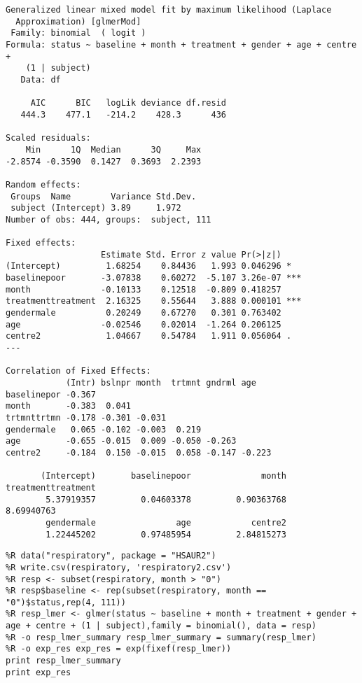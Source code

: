 \documentclass[12pt,fleqn]{article}\usepackage{../common}
\begin{document}
\begin{verbatim}
Generalized linear mixed model fit by maximum likelihood (Laplace
  Approximation) [glmerMod]
 Family: binomial  ( logit )
Formula: status ~ baseline + month + treatment + gender + age + centre +  
    (1 | subject)
   Data: df

     AIC      BIC   logLik deviance df.resid 
   444.3    477.1   -214.2    428.3      436 

Scaled residuals: 
    Min      1Q  Median      3Q     Max 
-2.8574 -0.3590  0.1427  0.3693  2.2393 

Random effects:
 Groups  Name        Variance Std.Dev.
 subject (Intercept) 3.89     1.972   
Number of obs: 444, groups:  subject, 111

Fixed effects:
                   Estimate Std. Error z value Pr(>|z|)    
(Intercept)         1.68254    0.84436   1.993 0.046296 *  
baselinepoor       -3.07838    0.60272  -5.107 3.26e-07 ***
month              -0.10133    0.12518  -0.809 0.418257    
treatmenttreatment  2.16325    0.55644   3.888 0.000101 ***
gendermale          0.20249    0.67270   0.301 0.763402    
age                -0.02546    0.02014  -1.264 0.206125    
centre2             1.04667    0.54784   1.911 0.056064 .  
---

Correlation of Fixed Effects:
            (Intr) bslnpr month  trtmnt gndrml age   
baselinepor -0.367                                   
month       -0.383  0.041                            
trtmnttrtmn -0.178 -0.301 -0.031                     
gendermale   0.065 -0.102 -0.003  0.219              
age         -0.655 -0.015  0.009 -0.050 -0.263       
centre2     -0.184  0.150 -0.015  0.058 -0.147 -0.223

       (Intercept)       baselinepoor              month treatmenttreatment 
        5.37919357         0.04603378         0.90363768         8.69940763 
        gendermale                age            centre2 
        1.22445202         0.97485954         2.84815273 

\end{verbatim}

\begin{verbatim}
%R data("respiratory", package = "HSAUR2")
%R write.csv(respiratory, 'respiratory2.csv')
%R resp <- subset(respiratory, month > "0")
%R resp$baseline <- rep(subset(respiratory, month == "0")$status,rep(4, 111))
%R resp_lmer <- glmer(status ~ baseline + month + treatment + gender + age + centre + (1 | subject),family = binomial(), data = resp)
%R -o resp_lmer_summary resp_lmer_summary = summary(resp_lmer)
%R -o exp_res exp_res = exp(fixef(resp_lmer))
print resp_lmer_summary
print exp_res
\end{verbatim}
\end{document}
